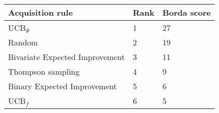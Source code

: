 \begin{tabular}{lll}
Acquisition rule & Rank & Borda score \\ 
\hline 
UCB$_\Phi$                                    & 1 & 27 \\ 
Random                                        & 2 & 19 \\ 
Bivariate Expected Improvement                & 3 & 11 \\ 
Thompson sampling                             & 4 & 9 \\ 
Binary Expected Improvement \citep{Tesch2013} & 5 & 6 \\ 
UCB$_f$ \citep{Tesch2013}                     & 6 & 5 \\ 
\hline 
\end{tabular}